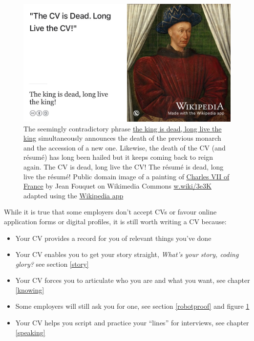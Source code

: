 \documentclass[
]{book}
\providecommand{\tightlist}{%
  \setlength{\itemsep}{0pt}\setlength{\parskip}{0pt}}
\begin{document}
\begin{figure}

{\centering \includegraphics[width=0.99\linewidth]{images/the-king-is-dead} 

}

\caption{The seemingly contradictory phrase \href{https://en.wikipedia.org/wiki/The_king_is_dead,_long_live_the_king!}{the king is dead, long live the king} simultaneously announces the death of the previous monarch and the accession of a new one. Likewise, the death of the CV (and résumé) has long been hailed but it keeps coming back to reign again. The CV is dead, long live the CV! The résumé is dead, long live the résumé! Public domain image of a painting of \href{https://en.wikipedia.org/wiki/Charles_VII_of_France}{Charles VII of France} by Jean Fouquet on Wikimedia Commons \href{https://w.wiki/3e3K}{w.wiki/3e3K} adapted using the \href{https://apps.apple.com/us/app/wikipedia/id324715238}{Wikipedia app}}\label{fig:longlive-fig}
\end{figure}



While it is true that some employers don't accept CVs or favour online application forms or digital profiles, it is still worth writing a CV because:

\begin{itemize}
\tightlist
\item
  Your CV provides a record for you of relevant things you've done
\item
  Your CV enables you to get your story straight, \emph{What's your story, coding glory?} see section \ref{story} \citep{whatsthestory}
\item
  Your CV forces you to articulate who you are and what you want, see chapter \ref{knowing}
\item
  Some employers will still ask you for one, see section \ref{robotproof} and figure \ref{fig:longlive-fig}
\item
  Your CV helps you script and practice your ``lines'' for interviews, see chapter \ref{speaking}
\end{itemize}
\end{document}
